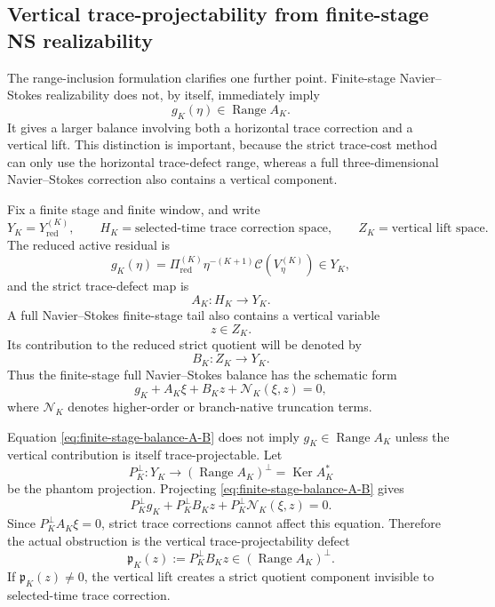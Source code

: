 \documentclass[11pt]{article}
\numberwithin{equation}{section}
\DeclareMathOperator{\Range}{Range}
\DeclareMathOperator{\Ker}{Ker}
\newcommand{\calC}{\mathcal C}
\begin{document}
\subsection{Vertical trace-projectability from finite-stage NS realizability}\label{subsec:trace-projectability-from-realizability}

The range-inclusion formulation clarifies one further point.  Finite-stage Navier--Stokes realizability does not, by itself, immediately imply
\[
        g_K(\eta)\in \Range A_K .
\]
It gives a larger balance involving both a horizontal trace correction and a vertical lift.  This distinction is important, because the strict trace-cost method can only use the horizontal trace-defect range, whereas a full three-dimensional Navier--Stokes correction also contains a vertical component.

Fix a finite stage and finite window, and write
\[
        Y_K=Y_{\mathrm{red}}^{(K)},
        \qquad H_K=\text{selected-time trace correction space},
        \qquad Z_K=\text{vertical lift space}.
\]
The reduced active residual is
\[
        g_K(\eta)=
        \Pi_{\mathrm{red}}^{(K)}\eta^{-(K+1)}\calC(V_\eta^{(K)})
        \in Y_K,
\]
and the strict trace-defect map is
\[
        A_K:H_K\to Y_K.
\]
A full Navier--Stokes finite-stage tail also contains a vertical variable
\[
        z\in Z_K.
\]
Its contribution to the reduced strict quotient will be denoted by
\[
        B_K:Z_K\to Y_K.
\]
Thus the finite-stage full Navier--Stokes balance has the schematic form
\begin{equation}\label{eq:finite-stage-balance-A-B}
        g_K+A_K\xi+B_Kz+\mathcal N_K(\xi,z)=0,
\end{equation}
where \(\mathcal N_K\) denotes higher-order or branch-native truncation terms.

Equation \eqref{eq:finite-stage-balance-A-B} does not imply \(g_K\in\Range A_K\) unless the vertical contribution is itself trace-projectable.  Let
\[
        P_K^\perp:Y_K\to(\Range A_K)^\perp=\Ker A_K^*
\]
be the phantom projection.  Projecting \eqref{eq:finite-stage-balance-A-B} gives
\[
        P_K^\perp g_K+P_K^\perp B_Kz+P_K^\perp\mathcal N_K(\xi,z)=0.
\]
Since \(P_K^\perp A_K\xi=0\), strict trace corrections cannot affect this equation.  Therefore the actual obstruction is the vertical trace-projectability defect
\begin{equation}\label{eq:vertical-trace-projectability-defect}
        \mathfrak p_K(z):=P_K^\perp B_Kz
        \in (\Range A_K)^\perp.
\end{equation}
If \(\mathfrak p_K(z)\ne0\), the vertical lift creates a strict quotient component invisible to selected-time trace correction.
\end{document}
